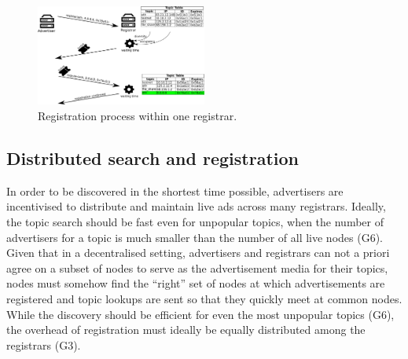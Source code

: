 

\begin{figure}
    \includegraphics[width=0.5\textwidth]{img/registration}
    \caption{Registration process within one registrar.}
    \label{fig:registration}
\end{figure}


\subsection{Distributed search and registration}

In order to be discovered in the shortest time possible, advertisers are incentivised to distribute and maintain live ads across many registrars. Ideally, the topic search should be fast even for unpopular topics, \ie when the number of advertisers for a topic is much smaller than the number of all live nodes (G6). 
Given that in a decentralised setting, advertisers and registrars can not a priori agree on a subset of nodes to serve as the advertisement media for their topics, nodes must somehow find the ``right'' set of nodes at which advertisements are registered and topic lookups are sent so that they quickly meet at common nodes. While the discovery should be efficient for even the most unpopular topics (G6), the overhead of registration must ideally be equally distributed among the registrars (G3).

